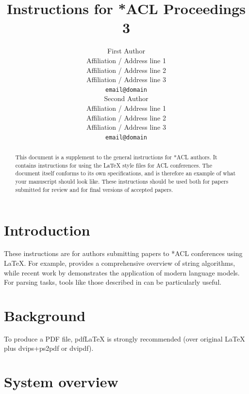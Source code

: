 \documentclass[11pt]{article}
\title{Instructions for *ACL Proceedings 3}
\author{First Author \\
  Affiliation / Address line 1 \\
  Affiliation / Address line 2 \\
  Affiliation / Address line 3 \\
  \texttt{email@domain} \\\And
  Second Author \\
  Affiliation / Address line 1 \\
  Affiliation / Address line 2 \\
  Affiliation / Address line 3 \\
  \texttt{email@domain} \\}
\begin{document}
\maketitle
\begin{abstract}
This document is a supplement to the general instructions for *ACL authors. It contains instructions for using the \LaTeX{} style files for ACL conferences.
The document itself conforms to its own specifications, and is therefore an example of what your manuscript should look like.
These instructions should be used both for papers submitted for review and for final versions of accepted papers.
\end{abstract}

\section{Introduction}

These instructions are for authors submitting papers to *ACL conferences using \LaTeX. For example, \citet{Gusfield:97} provides a comprehensive overview of string algorithms, while recent work by \citet{nogueira2019passage} demonstrates the application of modern language models. For parsing tasks, tools like those described in \citet{rasooli-tetrault-2015} can be particularly useful.

\section{Background}

To produce a PDF file, pdf\LaTeX{} is strongly recommended (over original \LaTeX{} plus dvips+ps2pdf or dvipdf).

\section{System overview}
\end{document}

